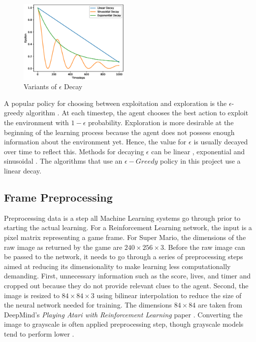 \documentclass[notitlepage,a4paper,11pt]{article}
\begin{document}
\begin{figure}
\vspace{-40pt}
  \begin{center}
    \includegraphics[width=0.48\textwidth]{figs/epsilon_decay.eps}
  \end{center}
  \vspace{-20pt}
  \caption{Variants of $\epsilon$ Decay}
\end{figure}

A popular policy for choosing between exploitation and exploration is the $\epsilon$-greedy algorithm \cite{white2012bandit}. At each timestep, the agent chooses the best action to exploit the environment with $1-\epsilon$ probability. Exploration is more desirable at the beginning of the learning process because the agent does not possess enough information about the environment yet. Hence, the value for $\epsilon$ is usually decayed over time to reflect this. Methods for decaying $\epsilon$ can be linear \cite{mnih2015human}, exponential \cite{maroti2019rbed} and sinusoidal  \cite{chuchro2017game}. The algorithms that use an $\epsilon-Greedy$ policy in this project use a linear decay.


\subsection{Frame Preprocessing} \label{frame_preprocessing}
Preprocessing data is a step all Machine Learning systems go through prior to starting the actual learning. For a Reinforcement Learning network, the input is a pixel matrix representing a game frame. For Super Mario, the dimensions of the raw image as returned by the game are $240 \times 256 \times 3$. Before the raw image can be passed to the network, it needs to go through a series of preprocessing steps aimed at reducing its dimensionality to make learning less computationally demanding. First, unnecessary information such as the score, lives, and timer and cropped out because they do not provide relevant clues to the agent. Second, the image is resized to $84 \times 84 \times 3$ using bilinear interpolation \cite{gribbon2004novel} to reduce the size of the neural network needed for training. The dimensions $84 \times 84$ are taken from DeepMind's \textit{Playing Atari with Reinforcement Learning} paper \cite{DBLP:journals/corr/MnihKSGAWR13}. Converting the image to grayscale is often applied preprocessing step, though grayscale models tend to perform lower \cite{lample2017playing}.
\end{document}
